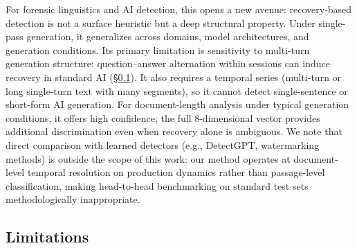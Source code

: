 \documentclass[final]{clv2025}
\begin{document}
For forensic linguistics and AI detection, this opens a new avenue: recovery-based detection is not a surface heuristic but a deep structural property. Under single-pass generation, it generalizes across domains, model architectures, and generation conditions. Its primary limitation is sensitivity to multi-turn generation structure: question--answer alternation within sessions can induce recovery in standard AI (\S\ref{sec:limitations}). It also requires a temporal series (multi-turn or long single-turn text with many segments), so it cannot detect single-sentence or short-form AI generation. For document-length analysis under typical generation conditions, it offers high confidence; the full 8-dimensional vector provides additional discrimination even when recovery alone is ambiguous. We note that direct comparison with learned detectors (e.g., DetectGPT, watermarking methods) is outside the scope of this work: our method operates at document-level temporal resolution on production dynamics rather than passage-level classification, making head-to-head benchmarking on standard test sets methodologically inappropriate.

\subsection{Limitations}
\label{sec:limitations}
\end{document}
